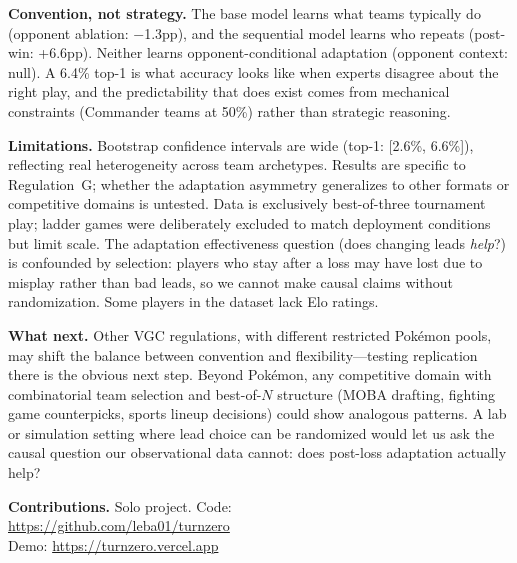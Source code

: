 \documentclass{article}
\begin{document}
\textbf{Convention, not strategy.}
The base model learns what teams typically do (opponent ablation: $-$1.3pp), and the sequential model learns who repeats (post-win: +6.6pp). Neither learns opponent-conditional adaptation (opponent context: null).
A 6.4\% top-1 is what accuracy looks like when experts disagree about the right play, and the predictability that does exist comes from mechanical constraints (Commander teams at 50\%) rather than strategic reasoning.

\textbf{Limitations.}
Bootstrap confidence intervals are wide (top-1: [2.6\%, 6.6\%]), reflecting real heterogeneity across team archetypes.
Results are specific to Regulation~G; whether the adaptation asymmetry generalizes to other formats or competitive domains is untested.
Data is exclusively best-of-three tournament play; ladder games were deliberately excluded to match deployment conditions but limit scale.
The adaptation effectiveness question (does changing leads \emph{help}?) is confounded by selection: players who stay after a loss may have lost due to misplay rather than bad leads, so we cannot make causal claims without randomization.
Some players in the dataset lack Elo ratings.

\textbf{What next.}
Other VGC regulations, with different restricted Pok\'emon pools, may shift the balance between convention and flexibility---testing replication there is the obvious next step.
Beyond Pok\'emon, any competitive domain with combinatorial team selection and best-of-$N$ structure (MOBA drafting, fighting game counterpicks, sports lineup decisions) could show analogous patterns.
A lab or simulation setting where lead choice can be randomized would let us ask the causal question our observational data cannot: does post-loss adaptation actually help?

\textbf{Contributions.}
Solo project. Code:\\
\url{https://github.com/leba01/turnzero}\\
Demo: \url{https://turnzero.vercel.app}


\end{document}
